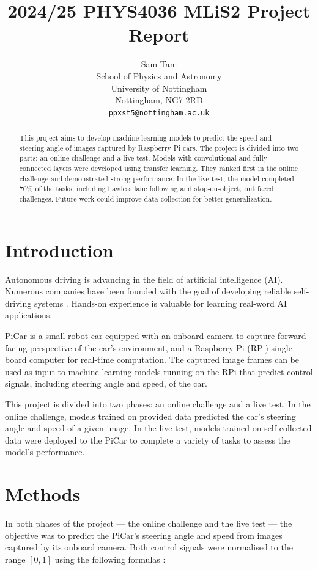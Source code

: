 \documentclass{article}
\title{2024/25 PHYS4036 MLiS2 Project Report}
\author{%
  Sam Tam \\
  School of Physics and Astronomy\\
  University of Nottingham\\
  Nottingham, NG7 2RD \\
  \texttt{ppxst5@nottingham.ac.uk}
}
\begin{document}
\maketitle


\begin{abstract}
  This project aims to develop machine learning models to predict the speed and steering angle of images captured by Raspberry Pi cars. The project is divided into two parts: an online challenge and a live test. Models with convolutional and fully connected layers were developed using transfer learning. They ranked first in the online challenge and demonstrated strong performance. In the live test, the model completed 70\% of the tasks, including flawless lane following and stop-on-object, but faced challenges. Future work could improve data collection for better generalization.
\end{abstract}

\section{Introduction}
Autonomous driving is advancing in the field of artificial intelligence (AI). Numerous companies have been founded with the goal of developing reliable self-driving systems \citep{Law_2023}. Hands-on experience is valuable for learning real-word AI applications.

PiCar \citep{SunFounder} is a small robot car equipped with an onboard camera to capture forward-facing perspective of the car's environment, and a Raspberry Pi (RPi) single-board computer \citep{RaspberryPi} for real-time computation. The captured image frames can be used as input to machine learning models running on the RPi that predict control signals, including steering angle and speed, of the car.

This project is divided into two phases: an online challenge and a live test. In the online challenge, models trained on provided data predicted the car's steering angle and speed of a given image. In the live test, models trained on self-collected data were deployed to the PiCar to complete a variety of tasks to assess the model's performance.


\section{Methods}
In both phases of the project — the online challenge and the live test — the objective was to predict the PiCar's steering angle and speed from images captured by its onboard camera. Both control signals were normalised to the range \([0, 1]\) using the following formulas \citep{Kaggle}:
\end{document}

